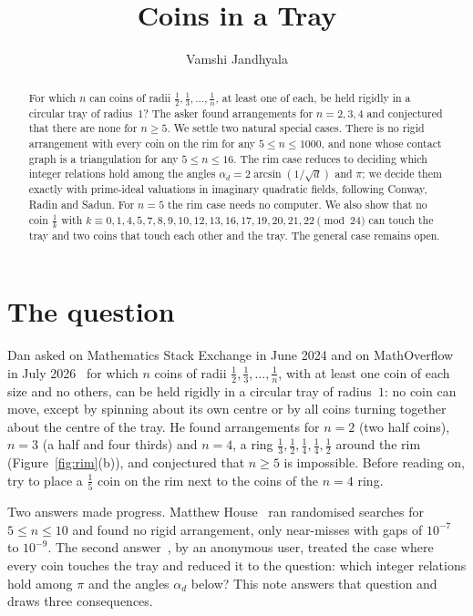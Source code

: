 \documentclass[11pt]{amsart}
\title{Coins in a Tray}
\author{Vamshi Jandhyala}
\theoremstyle{remark}
\begin{document}
\begin{abstract}
For which $n$ can coins of radii $\frac12,\frac13,\dots,\frac1n$, at least one of each, be held rigidly in a circular tray of radius~$1$? The asker found arrangements for $n=2,3,4$ and conjectured that there are none for $n\ge5$. We settle two natural special cases. There is no rigid arrangement with every coin on the rim for any $5\le n\le1000$, and none whose contact graph is a triangulation for any $5\le n\le16$. The rim case reduces to deciding which integer relations hold among the angles $\alpha_d=2\arcsin(1/\sqrt d)$ and $\pi$; we decide them exactly with prime-ideal valuations in imaginary quadratic fields, following Conway, Radin and Sadun. For $n=5$ the rim case needs no computer. We also show that no coin $\frac1k$ with $k\equiv0,1,4,5,7,8,9,10,12,13,16,17,19,20,21,22\pmod{24}$ can touch the tray and two coins that touch each other and the tray. The general case remains open.
\end{abstract}

\maketitle

\section{The question}

Dan asked on Mathematics Stack Exchange in June 2024 and on MathOverflow in July 2026~\cite{MO} for which $n$ coins of radii $\frac12,\frac13,\dots,\frac1n$, with at least one coin of each size and no others, can be held rigidly in a circular tray of radius~$1$: no coin can move, except by spinning about its own centre or by all coins turning together about the centre of the tray. He found arrangements for $n=2$ (two half coins), $n=3$ (a half and four thirds) and $n=4$, a ring $\frac13,\frac12,\frac14,\frac14,\frac12$ around the rim (Figure~\ref{fig:rim}(b)), and conjectured that $n\ge5$ is impossible. Before reading on, try to place a $\frac15$ coin on the rim next to the coins of the $n=4$ ring.

Two answers made progress. Matthew House~\cite{House} ran randomised searches for $5\le n\le10$ and found no rigid arrangement, only near-misses with gaps of $10^{-7}$ to $10^{-9}$. The second answer~\cite{U}, by an anonymous user, treated the case where every coin touches the tray and reduced it to the question: which integer relations hold among $\pi$ and the angles $\alpha_d$ below? This note answers that question and draws three consequences.
\end{document}
